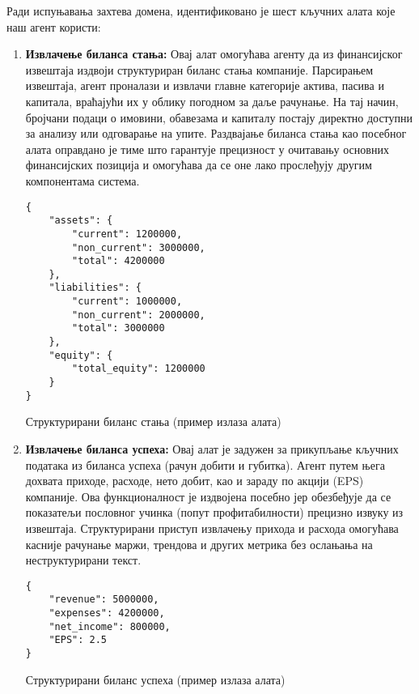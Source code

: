 Ради испуњавања захтева домена, идентификовано је шест кључних алата које наш агент користи:
\begin{enumerate}
    \item \textbf{Извлачење биланса стања:} Овај алат омогућава агенту да из финансијског извештаја издвоји структуриран биланс стања компаније. Парсирањем извештаја, агент проналази и извлачи главне категорије актива, пасива и капитала, враћајући их у облику погодном за даље рачунање. На тај начин, бројчани подаци о имовини, обавезама и капиталу постају директно доступни за анализу или одговарање на упите. Раздвајање биланса стања као посебног алата оправдано је тиме што гарантује прецизност у очитавању основних финансијских позиција и омогућава да се оне лако прослеђују другим компонентама система.

    \begin{listing}[!ht]
    \begin{verbatim}
{
    "assets": {
        "current": 1200000,
        "non_current": 3000000,
        "total": 4200000
    },
    "liabilities": {
        "current": 1000000,
        "non_current": 2000000,
        "total": 3000000
    },
    "equity": {
        "total_equity": 1200000
    }
}
    \end{verbatim}
    \caption{Структурирани биланс стања (пример излаза алата)}\label{lst:balance_sheet_json}
    \end{listing}

    \item \textbf{Извлачење биланса успеха:} Овај алат је задужен за прикупљање кључних података из биланса успеха (рачун добити и губитка). Агент путем њега дохвата приходе, расходе, нето добит, као и зараду по акцији (EPS) компаније. Ова функционалност је издвојена посебно јер обезбеђује да се показатељи пословног учинка (попут профитабилности) прецизно извуку из извештаја. Структурирани приступ извлачењу прихода и расхода омогућава касније рачунање маржи, трендова и других метрика без ослањања на неструктурирани текст.

    \begin{listing}[!ht]
    \begin{verbatim}
{
    "revenue": 5000000,
    "expenses": 4200000,
    "net_income": 800000,
    "EPS": 2.5
}
    \end{verbatim}
    \caption{Структурирани биланс успеха (пример излаза алата)}\label{lst:income_statement_json}
    \end{listing}


\end{enumerate}
